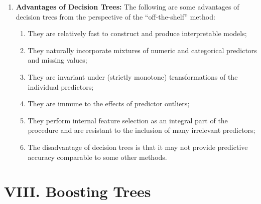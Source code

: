 \documentclass[12pt]{article}
\begin{document}
\begin{enumerate}[label=\textbf{\arabic*.}]
	\item \textbf{Advantages of Decision Trees:} The following are some advantages of decision trees from the perspective of the ``off-the-shelf'' method: 
	\begin{enumerate}
		\item They are relatively fast to construct and produce interpretable models; 
		\item They naturally incorporate mixtures of numeric and categorical predictors and missing values; 
		\item They are invariant under (strictly monotone) transformations of the individual predictors; 
		\item They are immune to the effects of predictor outliers; 
		\item They perform internal feature selection as an integral part of the procedure and are resistant to the inclusion of many irrelevant predictors; 
		\item The disadvantage of decision trees is that it may not provide predictive accuracy comparable to some other methods. 
	\end{enumerate}
\end{enumerate}


\section*{VIII. Boosting Trees}
\end{document}
